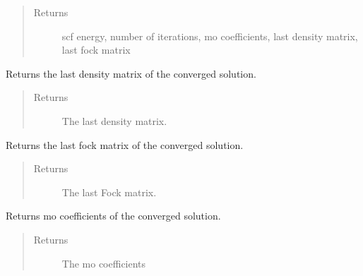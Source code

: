 \documentclass[letterpaper,10pt,english]{sphinxmanual}
\begin{document}
\begin{fulllineitems}
\begin{fulllineitems}
\begin{quote}
\begin{description}
\begin{itemize}
\end{itemize}

\item[{Returns}] \leavevmode
scf energy, number of iterations, mo coefficients, last density matrix, last fock matrix

\end{description}\end{quote}

\end{fulllineitems}


\begin{fulllineitems}
\label{\detokenize{RHF:hf.RHF.RHF.get_last_dens}}
Returns the last density matrix of the converged solution.
\begin{quote}\begin{description}
\item[{Returns}] \leavevmode
The last density matrix.

\end{description}\end{quote}

\end{fulllineitems}


\begin{fulllineitems}
\label{\detokenize{RHF:hf.RHF.RHF.get_last_fock}}
Returns the last fock matrix of the converged solution.
\begin{quote}\begin{description}
\item[{Returns}] \leavevmode
The last Fock matrix.

\end{description}\end{quote}

\end{fulllineitems}


\begin{fulllineitems}
\label{\detokenize{RHF:hf.RHF.RHF.get_mo_coeff}}
Returns mo coefficients of the converged solution.
\begin{quote}\begin{description}
\item[{Returns}] \leavevmode
The mo coefficients


\end{description}
\end{quote}
\end{fulllineitems}
\end{fulllineitems}
\end{document}

